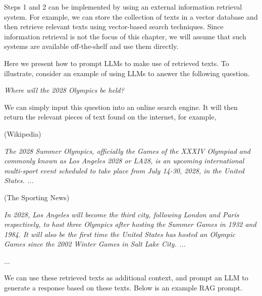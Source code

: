 Steps 1 and 2 can be implemented by using an external information retrieval system. For example, we can store the collection of texts in a vector database and then retrieve relevant texts using vector-based search techniques. Since information retrieval is not the focus of this chapter, we will assume that such systems are available off-the-shelf and use them directly.

Here we present how to prompt LLMs to make use of retrieved texts. To illustrate, consider an example of using LLMs to answer the following question.

\begin{center}
\textit{Where will the 2028 Olympics be held?}
\end{center}

We can simply input this question into an online search engine. It will then return the relevant pieces of text found on the internet, for example,

\begin{flushleft}
\begingroup
\setlength{\leftskip}{2em}
\setlength{\rightskip}{2em}

(Wikipedia)

\textit{The 2028 Summer Olympics, officially the Games of the XXXIV Olympiad and commonly known as Los Angeles 2028 or LA28, is an upcoming international multi-sport event scheduled to take place from July 14-30, 2028, in the United States.  ...}

\vspace{0.5em}
(The Sporting News)

\textit{In 2028, Los Angeles will become the third city, following London and Paris respectively, to host three Olympics after hosting the Summer Games in 1932 and 1984. It will also be the first time the United States has hosted an Olympic Games since the 2002 Winter Games in Salt Lake City. ...}

\vspace{0.5em}

...

\endgroup
\end{flushleft}

We can use these retrieved texts as additional context, and prompt an LLM to generate a response based on these texts. Below is an example RAG prompt.

